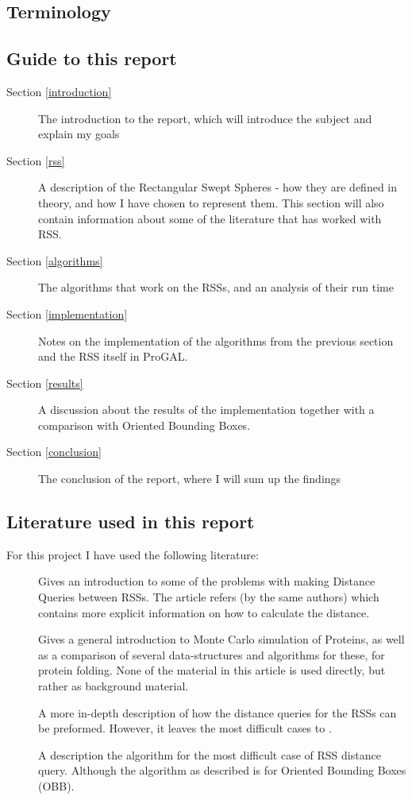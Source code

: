 \subsection{Terminology}

\subsection{Guide to this report}
\begin{description}
\item[Section \ref{introduction}] The introduction to the report, which will introduce the subject and explain my goals
\item[Section \ref{rss}] A description of the Rectangular Swept Spheres - how they are defined in theory, and how I have chosen to represent them. This section will also contain information about some of the literature that has worked with RSS.
\item[Section \ref{algorithms}] The algorithms that work on the RSSs, and an analysis of their run time 
\item[Section \ref{implementation}] Notes on the implementation of the algorithms from the previous section and the RSS itself in ProGAL.
\item[Section \ref{results}] A discussion about the results of the implementation together with a comparison with Oriented Bounding Boxes. 
\item[Section \ref{conclusion}] The conclusion of the report, where I will sum up the findings 
\end{description}

\subsection{Literature used in this report}
For this project I have used the following literature: 
\begin{description}
\item[\cite{larsen00fast}] Gives an introduction to some of the problems with making Distance Queries between RSSs. The article refers \cite{Larsen99fastproximity} (by the same authors) which contains more explicit information on how to calculate the distance. 
\item[\cite{Lotan03algorithmand}] Gives a general introduction to Monte Carlo simulation of Proteins, as well as a comparison of several data-structures and algorithms for these, for protein folding. None of the material in this article is used directly, but rather as background material.
\item[\cite{Larsen99fastproximity}] A more in-depth description of how the distance queries for the RSSs can be preformed. However, it leaves the most difficult cases to \cite{237244}.
\item[\cite{237244}] A description the algorithm for the most difficult case of RSS distance query. Although the algorithm as described is for Oriented Bounding Boxes (OBB).
\end{description}
